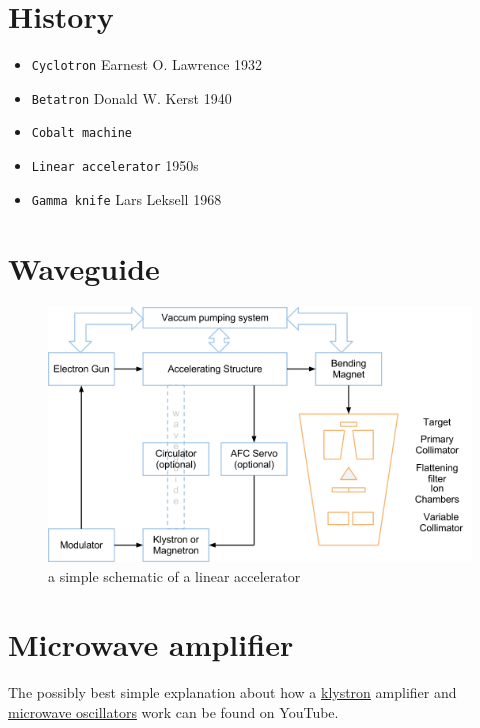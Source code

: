 \documentclass[]{book}
\providecommand{\tightlist}{%
  \setlength{\itemsep}{0pt}\setlength{\parskip}{0pt}}
\theoremstyle{definition}
\theoremstyle{definition}
\theoremstyle{definition}
\theoremstyle{remark}
\begin{document}
\section{History}\label{history-1}

\begin{itemize}
\tightlist
\item
  \texttt{Cyclotron} Earnest O. Lawrence 1932
\item
  \texttt{Betatron} Donald W. Kerst 1940
\item
  \texttt{Cobalt\ machine}
\item
  \texttt{Linear\ accelerator} 1950s
\item
  \texttt{Gamma\ knife} Lars Leksell 1968
\end{itemize}

\section{Waveguide}\label{waveguide}

\begin{figure}

{\centering \includegraphics{figures/components} 

}

\caption{a simple schematic of a linear accelerator}\label{fig:unnamed-chunk-5}
\end{figure}

\section{Microwave amplifier}\label{microwave-amplifier}

The possibly best simple explanation about how a
\href{https://www.youtube.com/watch?v=Fvud81pYGOg}{klystron} amplifier
and \href{https://www.youtube.com/watch?v=VkpEQZEGSkE\&t=108s}{microwave
oscillators} work can be found on YouTube.
\end{document}
